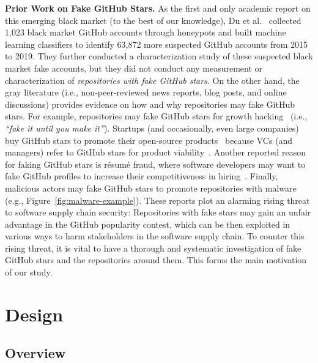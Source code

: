 \textbf{Prior Work on Fake GitHub Stars.}
As the first and only academic report on this emerging black market (to the best of our knowledge), Du et al.~\cite{DBLP:conf/acsac/DuYZDWH0020} collected 1,023 black market GitHub accounts through honeypots and built machine learning classifiers to identify 63,872 more suspected GitHub accounts from 2015 to 2019.  
They further conducted a characterization study of these suspected black market fake accounts, but they did not conduct any measurement or characterization of \emph{repositories with fake GitHub stars}. 
On the other hand, the gray literature (i.e., non-peer-reviewed news reports, blog posts, and online discussions) provides evidence on how and why repositories may fake GitHub stars.
For example, repositories may fake GitHub stars for growth hacking~\cite{bohnsack2019hack} (i.e., \emph{``fake it until you make it''}).
Startups (and occasionally, even large companies) buy GitHub stars to promote their open-source products~\cite{oceanbase, dagster} because VCs (and managers) refer to GitHub stars for product viability~\cite{%
startup-stars}.
Another reported reason for faking GitHub stars is r\'{e}sum\'{e} fraud, where software developers may want to fake GitHub profiles to increase their competitiveness in hiring~\cite{DBLP:conf/acsac/DuYZDWH0020}.
Finally, malicious actors may fake GitHub stars to promote repositories with malware~\cite{DBLP:conf/www/TaniaMRZF24, stargazer-goblin} (e.g., Figure~\ref{fig:malware-example}).
These reports plot an alarming rising threat to software supply chain security: 
Repositories with fake stars may gain an unfair advantage in the GitHub popularity contest, which can be then exploited in various ways to harm stakeholders in the software supply chain.
To counter this rising threat, it is vital to have a thorough and systematic investigation of fake GitHub stars and the repositories around them.
This forms the main motivation of our study.

\section{\SystemName Design}
\label{sec:tool-design}

\subsection{Overview}

